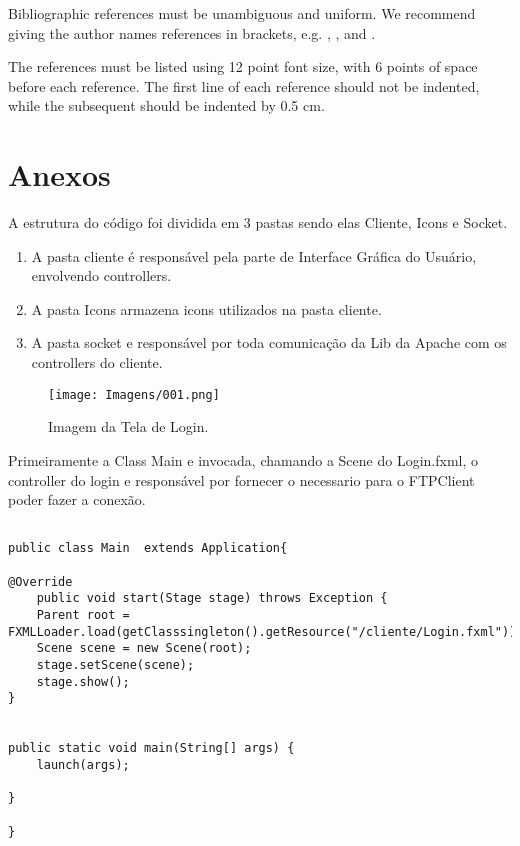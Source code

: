 \documentclass[12pt]{article}
\begin{document}
Bibliographic references must be unambiguous and uniform.  We recommend giving
the author names references in brackets, e.g. \cite{knuth:84},
\cite{boulic:91}, and \cite{smith:99}.

The references must be listed using 12 point font size, with 6 points of space
before each reference. The first line of each reference should not be
indented, while the subsequent should be indented by 0.5 cm.




\section{Anexos}
A estrutura do código foi dividida em 3 pastas sendo elas Cliente, Icons e Socket.

\begin{enumerate}
	
\item{A pasta cliente é responsável pela parte de Interface Gráfica do Usuário, envolvendo controllers.}
\item{A pasta Icons armazena icons utilizados na pasta cliente.}
\item{A pasta socket e responsável por toda comunicação da Lib da Apache com os controllers do cliente.}

\end{enumerate}

	


\begin{figure}[H]
	\centering
	\texttt{[image: Imagens/001.png]}
	\caption{ Imagem da Tela de Login.}
	\label{fig:01}
\end{figure}


Primeiramente a Class Main e invocada, chamando a Scene do Login.fxml, o controller do login e responsável por fornecer o necessario para o FTPClient poder fazer a conexão.

\begin{lstlisting}

public class Main  extends Application{

@Override
	public void start(Stage stage) throws Exception {
	Parent root = FXMLLoader.load(getClasssingleton().getResource("/cliente/Login.fxml"));
	Scene scene = new Scene(root);
	stage.setScene(scene);
	stage.show();
}


public static void main(String[] args) {
	launch(args);

}

}

\end{lstlisting}
\end{document}
